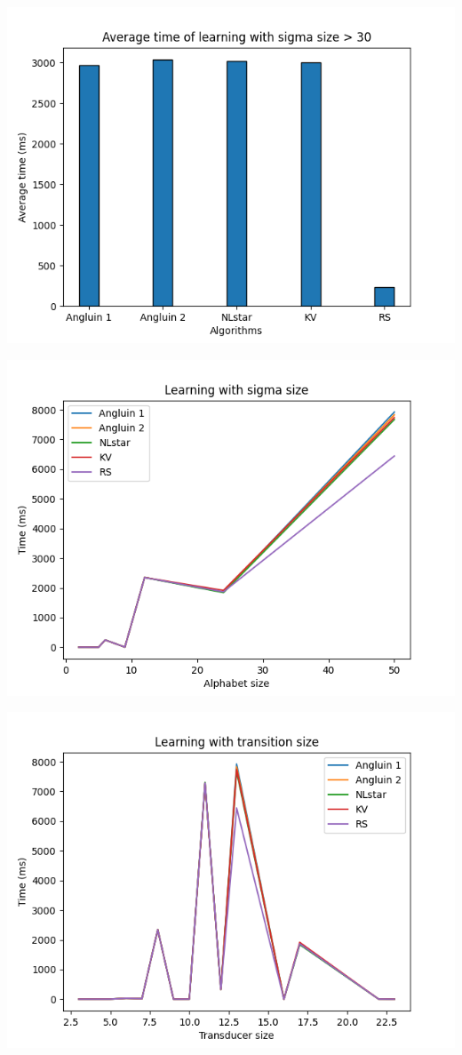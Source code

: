 \includegraphics[scale=0.75]{figures/average_time3.png}



\includegraphics[scale=0.75]{figures/sigma_size.png}

\includegraphics[scale=0.75]{figures/transition_size.png}

